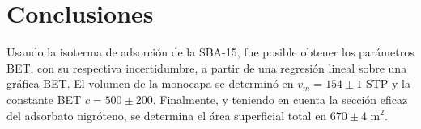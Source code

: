 \documentclass[fleqn,11pt]{SelfArx}
\begin{document}
	\section{Conclusiones}
	Usando la isoterma de adsorci\'on de la SBA-15, fue posible obtener los par\'ametros BET, con su respectiva incertidumbre, a partir de una regresi\'on lineal sobre una gr\'afica BET. El volumen de la monocapa se determin\'o en $v_m = 154\pm 1$ STP y la constante BET $c = 500 \pm 200$. Finalmente, y teniendo en cuenta la secci\'on eficaz del adsorbato nigr\'oteno, se determina el \'area superficial total en $670\pm 4$ m$^2$.
	
	
	
	
	
\end{document}
